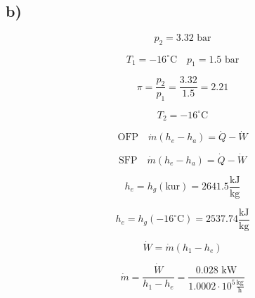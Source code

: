 

\subsection*{b)}

\[
p_2 = 3.32 \text{ bar}
\]

\[
T_1 = -16^\circ \text{C} \quad p_1 = 1.5 \text{ bar}
\]

\[
\pi = \frac{p_2}{p_1} = \frac{3.32}{1.5} = 2.21
\]

\[
T_2 = -16^\circ \text{C}
\]

\[
\text{OFP} \quad \dot{m}(h_e - h_a) = \dot{Q} - \dot{W}
\]

\[
\text{SFP} \quad \dot{m}(h_e - h_a) = \dot{Q} - \dot{W}
\]

\[
h_e = h_{g}(\text{kur}) = 2641.5 \frac{\text{kJ}}{\text{kg}}
\]

\[
h_e = h_{g}(-16^\circ \text{C}) = 2537.74 \frac{\text{kJ}}{\text{kg}}
\]

\[
\dot{W} = \dot{m}(h_1 - h_e)
\]

\[
\dot{m} = \frac{\dot{W}}{h_1 - h_e} = \frac{0.028 \text{ kW}}{1.0002 \cdot 10^5 \frac{\text{kg}}{\text{h}}}
\]